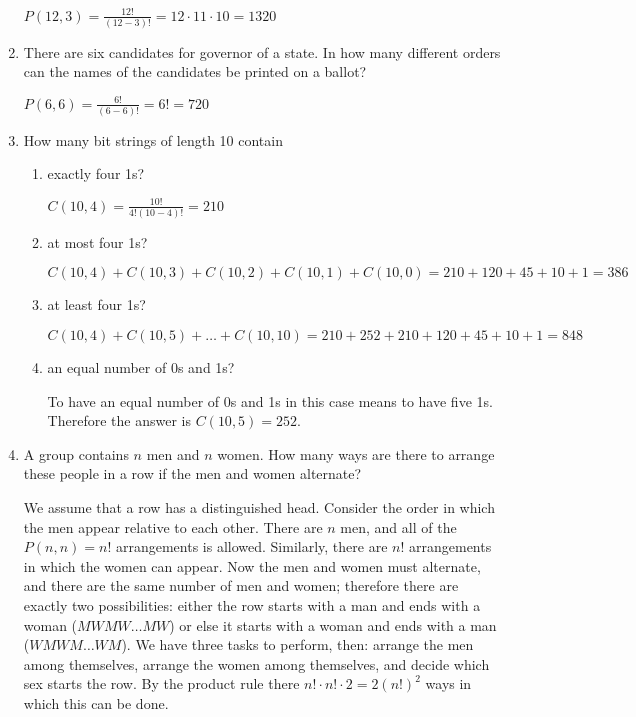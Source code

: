 \documentclass[11pt]{article}
\begin{document}
\begin{enumerate}[label=\textbf{\arabic*.}]
	$P(12, 3) = \frac{12!}{(12 - 3)!} = 12 \cdot 11 \cdot 10 = 1320$
	
	\item There are six candidates for governor of a state. In how many different orders can the names of the candidates be printed on a ballot?
	
	$P(6, 6) = \frac{6!}{(6 - 6)!} = 6! = 720$
	
	\item How many bit strings of length 10 contain
	
	\begin{enumerate}[label=\textbf{\alph*)}]
		\item exactly four 1s?
		
		$C(10, 4) = \frac{10!}{4!(10 - 4)!} = 210$
		
		\item at most four 1s?
		
		$C(10, 4) + C(10, 3) + C(10, 2) + C(10, 1) + C(10, 0) = 210 + 120 + 45 + 10 + 1 = 386$
		
		\item at least four 1s?
		
		$C(10, 4) + C(10, 5) + \ldots + C(10, 10) = 210 + 252 + 210 + 120 + 45 + 10 + 1 = 848$
		
		\item an equal number of 0s and 1s?
		
		To have an equal number of 0s and 1s in this case means to have five 1s. Therefore the answer is $C(10, 5) = 252$.
	\end{enumerate}

	\item A group contains $n$ men and $n$ women. How many ways are there to arrange these people in a row if the men and women alternate?
	
	We assume that a row has a distinguished head. Consider the order in which the men appear relative to each other. There are $n$ men, and all of the $P(n, n) = n!$ arrangements is allowed. Similarly, there are $n!$ arrangements in which the women can appear. Now the men and women must alternate, and there are the same number of men and women; therefore there are exactly two possibilities: either the row starts with a man and ends with a woman ($MWMW \ldots MW$) or else it starts with a woman and ends with a man ($WMWM \ldots WM$). We have three tasks to perform, then: arrange the men among themselves, arrange the women among themselves, and decide which sex starts the row. By the product rule there $n! \cdot n! \cdot 2 = 2(n!)^2$ ways in which this can be done.
	

\end{enumerate}
\end{document}

